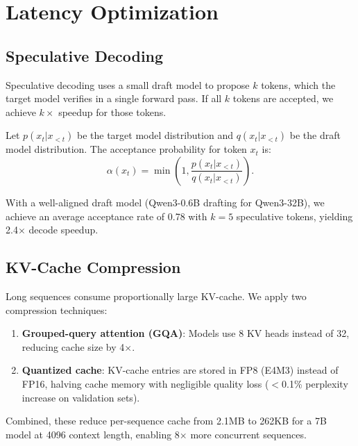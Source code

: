 \section{Latency Optimization}

\label{sec:latency}

\subsection{Speculative Decoding}

Speculative decoding uses a small draft model to propose $k$ tokens, which the
target model verifies in a single forward pass. If all $k$ tokens are accepted,
we achieve $k\times$ speedup for those tokens.

\begin{definition}
Let $p(x_t | x_{<t})$ be the target model distribution and $q(x_t | x_{<t})$
be the draft model distribution. The acceptance probability for token $x_t$ is:
\begin{equation}
\alpha(x_t) = \min\left(1, \frac{p(x_t | x_{<t})}{q(x_t | x_{<t})}\right).
\end{equation}
\end{definition}

With a well-aligned draft model (Qwen3-0.6B drafting for Qwen3-32B), we
achieve an average acceptance rate of 0.78 with $k=5$ speculative tokens,
yielding 2.4$\times$ decode speedup.

\subsection{KV-Cache Compression}

Long sequences consume proportionally large KV-cache. We apply two compression
techniques:
\begin{enumerate}[leftmargin=1.4em]
    \item \textbf{Grouped-query attention (GQA)}: Models use 8 KV heads instead
    of 32, reducing cache size by 4$\times$.
    \item \textbf{Quantized cache}: KV-cache entries are stored in FP8 (E4M3)
    instead of FP16, halving cache memory with negligible quality loss
    ($<$0.1\% perplexity increase on validation sets).
\end{enumerate}

Combined, these reduce per-sequence cache from 2.1MB to 262KB for a 7B model
at 4096 context length, enabling 8$\times$ more concurrent sequences.

